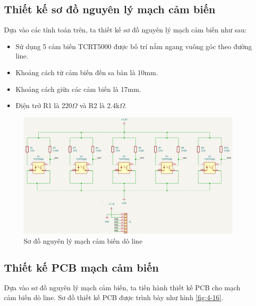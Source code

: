         \subsection{Thiết kế sơ đồ nguyên lý mạch cảm biến}
            \hspace*{0.6cm}Dựa vào các tính toán trên, ta thiết kế sơ đồ nguyên lý mạch cảm biến như sau:
            \begin{itemize}
                \item Sử dụng 5 cảm biến TCRT5000 được bố trí nằm ngang vuông góc theo đường line.
                \item Khoảng cách từ cảm biến đến sa bàn là 10mm.
                \item Khoảng cách giữa các cảm biến là 17mm.
                \item Điện trở R1 là 220$\Omega$ và R2 là 2.4k$\Omega$.
            \end{itemize}
            \begin{figure}[H]
                \centering
                \includegraphics[width=1\textwidth]{pictures/chapter4/c4_p13_SensorSchematic.png}
                \caption{Sơ đồ nguyên lý mạch cảm biến dò line}
                \label{fig:4-15}
            \end{figure}
        \subsection{Thiết kế PCB mạch cảm biến}

            \hspace*{0.6cm}Dựa vào sơ đồ nguyên lý mạch cảm biến, ta tiến hành thiết kế PCB cho mạch cảm biến dò line. Sơ đồ thiết kế PCB được trình bày như hình \ref{fig:4-16}.

